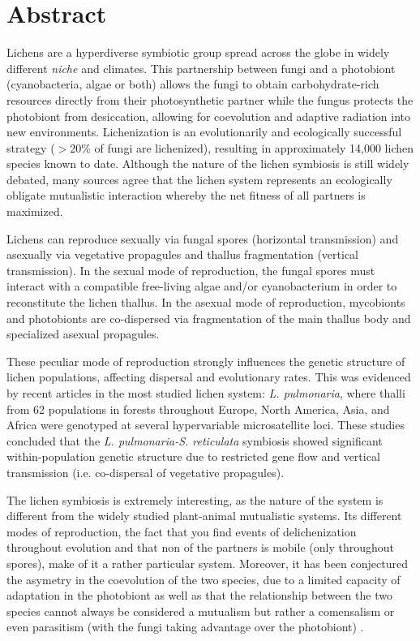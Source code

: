 \documentclass[runningheads,a4paper]{llncs}
\begin{document}
\section*{Abstract}
Lichens are a hyperdiverse symbiotic group spread across the globe in widely different {\em niche} and climates. This partnership between fungi and a photobiont (cyanobacteria, algae or both) allows the fungi to obtain carbohydrate-rich resources directly from their photosynthetic partner\cite{lutzoni2009lichens} while the fungus protects the photobiont from desiccation, allowing for coevolution and adaptive radiation into new environments\cite{nash1996lichen}. Lichenization is an evolutionarily and ecologically successful strategy ($>$20\% of fungi are lichenized), resulting in approximately 14,000 lichen species known to date\cite{lutzoni2009lichens,honegger1998lichen}. Although the nature of the lichen symbiosis is still widely debated, many sources agree that the lichen system represents an ecologically obligate mutualistic interaction whereby the net fitness of all partners is maximized\cite{bronstein1994our,honegger1998lichen}.

Lichens can reproduce sexually via fungal spores (horizontal transmission) and asexually via vegetative propagules and thallus fragmentation (vertical transmission). In the sexual mode of reproduction, the fungal spores must interact with a compatible free-living algae and/or cyanobacterium in order to reconstitute the lichen thallus. In the asexual mode of reproduction, mycobionts and photobionts are co-dispersed via fragmentation of the main thallus body and specialized asexual propagules.

These peculiar mode of reproduction strongly influences the genetic structure of lichen populations\cite{dal2012vertical,dal2011phylogeny}, affecting dispersal and evolutionary rates. This was evidenced by recent articles in the most studied lichen system: {\em L. pulmonaria}, where thalli from 62 populations in forests throughout Europe, North America, Asia, and Africa were genotyped at several hypervariable microsatellite loci\cite{dal2012vertical}. These studies concluded that the {\em L. pulmonaria-S. reticulata} symbiosis showed significant within-population genetic structure due to restricted gene flow and vertical transmission (i.e. co-dispersal of vegetative propagules). 

The lichen symbiosis is extremely interesting, as the nature of the system is different from the widely studied plant-animal mutualistic systems\cite{rohr2014structural,bascompte2006asymmetric,bascompte2006structure,bastolla2009architecture,rezende2007non,guimaraes2011evolution}. Its different modes of reproduction, the fact that you find events of delichenization throughout evolution \cite{lutzoni2001major} and that non of the partners is mobile (only throughout spores), make of it a rather particular system. Moreover, it has been conjectured the asymetry in the coevolution of the two species, due to a limited capacity of adaptation in the photobiont\cite{hill2009asymmetric} as well as that the relationship between the two species cannot always be considered a mutualism but rather a comensalism or even parasitism (with the fungi taking advantage over the photobiont) \cite{ahmadjian1993lichen}. 
\end{document}
